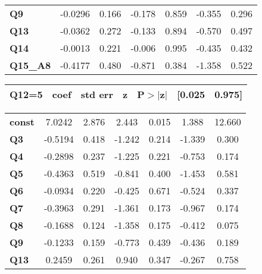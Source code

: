 \begin{center}
\begin{tabular}{lcccccc}
\textbf{Q9}      &      -0.0296  &        0.166     &    -0.178  &         0.859        &       -0.355    &        0.296     \\
\textbf{Q13}     &      -0.0362  &        0.272     &    -0.133  &         0.894        &       -0.570    &        0.497     \\
\textbf{Q14}     &      -0.0013  &        0.221     &    -0.006  &         0.995        &       -0.435    &        0.432     \\
\textbf{Q15\_A8} &      -0.4177  &        0.480     &    -0.871  &         0.384        &       -1.358    &        0.522     \\
\bottomrule
\end{tabular}
\begin{tabular}{ccccccc}
 \textbf{Q12=5}  & \textbf{coef} & \textbf{std err} & \textbf{z} & \textbf{P$> |$z$|$} & \textbf{[0.025} & \textbf{0.975]}  \\
\midrule
\bottomrule
\end{tabular}
\begin{tabular}{lcccccc}
\textbf{const}   &       7.0242  &        2.876     &     2.443  &         0.015        &        1.388    &       12.660     \\
\textbf{Q3}      &      -0.5194  &        0.418     &    -1.242  &         0.214        &       -1.339    &        0.300     \\
\textbf{Q4}      &      -0.2898  &        0.237     &    -1.225  &         0.221        &       -0.753    &        0.174     \\
\textbf{Q5}      &      -0.4363  &        0.519     &    -0.841  &         0.400        &       -1.453    &        0.581     \\
\textbf{Q6}      &      -0.0934  &        0.220     &    -0.425  &         0.671        &       -0.524    &        0.337     \\
\textbf{Q7}      &      -0.3963  &        0.291     &    -1.361  &         0.173        &       -0.967    &        0.174     \\
\textbf{Q8}      &      -0.1688  &        0.124     &    -1.358  &         0.175        &       -0.412    &        0.075     \\
\textbf{Q9}      &      -0.1233  &        0.159     &    -0.773  &         0.439        &       -0.436    &        0.189     \\
\textbf{Q13}     &       0.2459  &        0.261     &     0.940  &         0.347        &       -0.267    &        0.758     \\

\end{tabular}
\end{center}
